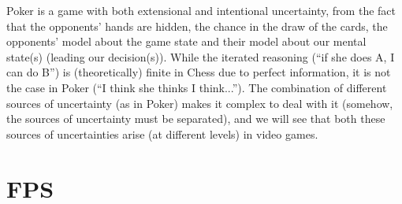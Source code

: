 Poker is a game with both extensional and intentional uncertainty, from the fact that the opponents' hands are hidden, the chance in the draw of the cards, the opponents' model about the game state and their model about our mental state(s) (leading our decision(s)). While the iterated reasoning (``if she does A, I can do B'') is (theoretically) finite in Chess due to perfect information, it is not the case in Poker (``I think she thinks I think...''). The combination of different sources of uncertainty (as in Poker) makes it complex to deal with it (somehow, the sources of uncertainty must be separated), and we will see that both these sources of uncertainties arise (at different levels) in video games.


\section{FPS}

